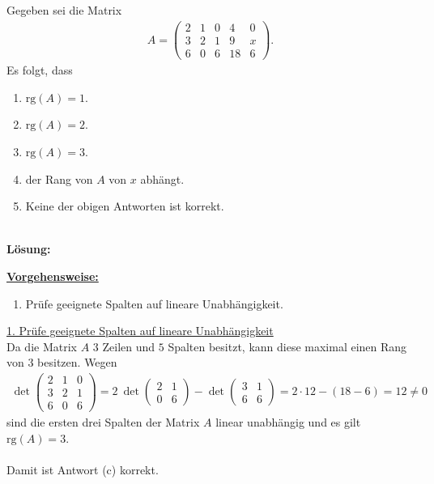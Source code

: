 \newpage

\subsection*{}
Gegeben sei die Matrix
\begin{align*}
	A =
	\begin{pmatrix}
		2 & 1 & 0 & 4 & 0 \\
		3 & 2 & 1 & 9 & x \\
		6 & 0 & 6 & 18 & 6 
	\end{pmatrix}.
\end{align*}
Es folgt, dass
\renewcommand{\labelenumi}{(\alph{enumi})}
\begin{enumerate}
	\item 
	$ \mathrm{rg}(A) = 1 $.
	\item 
	$ \mathrm{rg}(A) = 2 $.
	\item
	$ \mathrm{rg}(A) = 3 $.
	\item
	der Rang von $A$ von $x$ abhängt.
	\item
	Keine der obigen Antworten ist korrekt.
\end{enumerate}
\ \\
\textbf{Lösung:}
\begin{mdframed}
\underline{\textbf{Vorgehensweise:}}
\renewcommand{\labelenumi}{\theenumi.}
\begin{enumerate}
\item Prüfe geeignete Spalten auf lineare Unabhängigkeit.
\end{enumerate}
\end{mdframed}

\underline{1. Prüfe geeignete Spalten auf lineare Unabhängigkeit}\\
Da die Matrix $A $ $3$ Zeilen und $5$ Spalten besitzt, kann diese maximal einen Rang von $3$ besitzen.
Wegen 
\begin{align*}
	\det
	\begin{pmatrix}
		2 & 1 & 0\\
		3 & 2 & 1\\
		6 & 0 & 6
	\end{pmatrix}
		=
	2 \ 
	\det
	\begin{pmatrix}
		2 & 1 \\
		0 & 6
	\end{pmatrix}
	-
	\det
	\begin{pmatrix}
	3 & 1 \\
	6 & 6
	\end{pmatrix}
	= 
	2 \cdot 12 - ( 18 - 6 )
	=
	12 \neq 0
\end{align*}
sind die ersten drei Spalten der Matrix $A$ linear unabhängig und es gilt $\mathrm{rg}(A) = 3$.\\
\\
Damit ist Antwort (c) korrekt.



